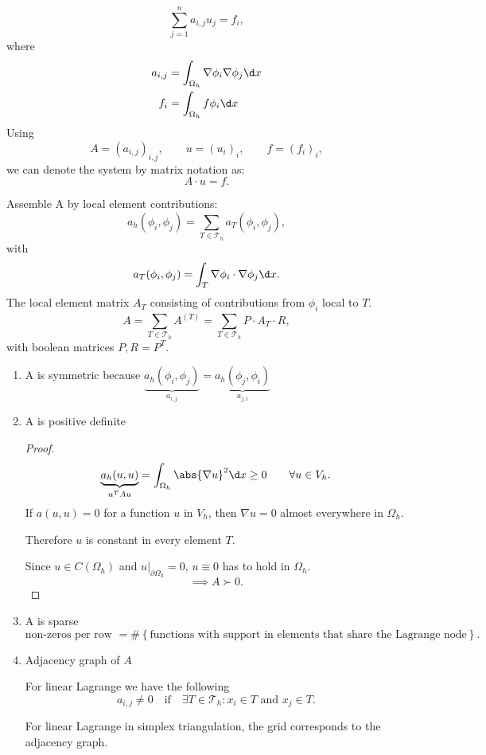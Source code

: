 \[
\sum_{j=1}^{n}{a_{i,j}u_{j}=f_{i}}
,\] 
where
\begin{align*}
	a_{i,j}&= \int_{\Omega _{h}}\nabla \phi _{i}\nabla \phi _{j} \d x \\
f_{i}&=\int_{\Omega _{h}}f \phi _{i} \d x
\end{align*}
Using
\[
	A = (a_{i,j})_{i,j}, \qquad u=(u_{i})_{i}, \qquad f=(f_{i})_{i}
,\] 
we can denote the system by matrix notation as:
\[
A \cdot u = f
.\] 

Assemble A by local element contributions:
\[
	a_{h}(\phi _{i}, \phi _{j}) = \sum_{T \in \mathcal{T}_{h}}^{}{a_{T}(\phi _{i}, \phi _{j})}
,\] 
with
\[
	a_{T}(\phi _{i}, \phi _{j}) = \int_{T}\nabla \phi _{i}\cdot \nabla \phi _{j} \d x
.\]
The local element matrix $A_{T}$ consisting of contributions from $\phi _{i}$ local to $T$.
\[
	A = \sum_{T \in \mathcal{T}_{h}}^{}{A^{(T)}}= \sum_{T \in \mathcal{T}_{h}}^{}{P\cdot A_{T} \cdot R}
,\] 
with boolean matrices $P, R = P^{T}$.


\begin{enumerate}[label=\alph{enumi})]
	\item A is symmetric because $ \underbrace{a_{h}(\phi
		_{i}, \phi _{j})}_{a_{i,j}} =
		\underbrace{a_{h}(\phi _{j}, \phi _{i})}_{a_{j,i}}
		$
	\item A is positive definite
		\begin{proof}
		\label{thm:Aispositivedefinite}
			\[
					\underbrace{a_{h}(u,u)}_{u^{T}Au} = \int_{\Omega_{h} }\abs{\nabla u} ^2 \d x \geq 0 \qquad \forall u \in V_{h}
			.\] 
			If  $a(u,u)=0$ for a function $u$ in $V_{h}$, then $\nabla u=0$ almost everywhere in $\Omega _{h}$.

			Therefore $u$ is constant in every element $T$.

			Since $u \in C(\Omega _{h})$ and $u|_{\partial \Omega _{h}}=0$, $u \equiv 0$ has to hold in $\Omega _{h}$.
			\[
			\implies A \succ 0
			.\] 
		\end{proof}

	\item A is sparse
		\[
		\text{non-zeros per row } = \#\left\{ \text{functions with support in elements that share the Lagrange node} \right\} 
		.\] 
	\item Adjacency graph of $A$

		
		For linear Lagrange we have the following
		\[
		a_{i,j}\neq 0 \quad \text{if} \quad \exists T \in \mathcal{T}_{h}\colon x_{i}\in T \text{ and } x_{j} \in T
		.\] 

		For linear Lagrange in simplex triangulation, the grid corresponds to the adjacency graph.
\end{enumerate}


